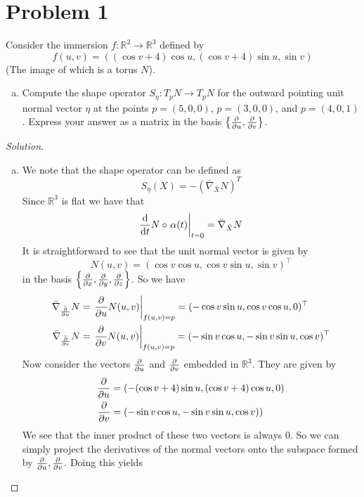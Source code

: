 \documentclass[a4paper]{article}
\begin{document}
\section*{Problem 1}%
Consider the immersion $f: \mathds{R}^2 \rightarrow \mathds{R}^3$ defined by 
\[
  f(u,v) = ((\cos v + 4)\cos u, (\cos v + 4) \sin u, \sin v)
\]
(The image of which is a torus $N$).
\begin{enumerate}[(a)]
  \item Compute the shape operator $S_\eta : T_pN \rightarrow T_pN$ for the outward pointing unit normal vector $\eta$ at the points $p = (5,0,0)$, $p = (3,0,0)$, and $p = (4,0,1)$. Express your answer as a matrix in the basis $\left\{ \pdv{u}, \pdv{v} \right\}$.
\end{enumerate}

\begin{proof}[Solution]
  \begin{enumerate}[(a)]
    \item We note that the shape operator can be defined as
      \[
        S_\eta (X) = - \left( \bar{\nabla}_{\bar{X}} N \right)^T
      \]
      Since $\mathds{R}^3$ is flat we have that
      \[
        \dv{t} N \circ \eval{\alpha(t)}_{t=0} = \bar{\nabla}_{\bar{X}} N
      \]
      It is straightforward to see that the unit normal vector is given by
      \[
        N(u,v) = (\cos v \cos u, \cos v \sin u, \sin v)^\top
      \]
      in the basis $\left\{ \pdv{x}, \pdv{y}, \pdv{z} \right\}$.
      So we have
      \[
        \begin{aligned}
          \bar{\nabla}_{\bar{\pdv{u}}}N &= \eval{\pdv{u} N(u,v)}_{f(u,v) = p} = (-\cos v \sin u, \cos v \cos u, 0)^\top\\
          \bar{\nabla}_{\bar{\pdv{v}}}N &= \eval{\pdv{v} N(u,v)}_{f(u,v) = p} = (-\sin v \cos u, -\sin v \sin u, \cos v)^\top\\
        \end{aligned}
      \]
      Now consider the vectors $\pdv{u}$ and $\pdv{v}$ embedded in $\mathds{R}^3$. They are given by
      \[
        \begin{aligned}
          \pdv{u} &= \left( -(\cos v + 4)\sin u, (\cos v + 4) \cos u, 0 \right) \\
          \pdv{v}  &= \left( -\sin v \cos u, -\sin v \sin u, \cos v)\right)
        \end{aligned}
      \]
      We see that the inner product of these two vectors is always 0. So we can simply project the derivatives of the normal vectors onto the subspace formed by $\pdv{u}, \pdv{v}$. Doing this yields

\end{enumerate}
\end{proof}
\end{document}

